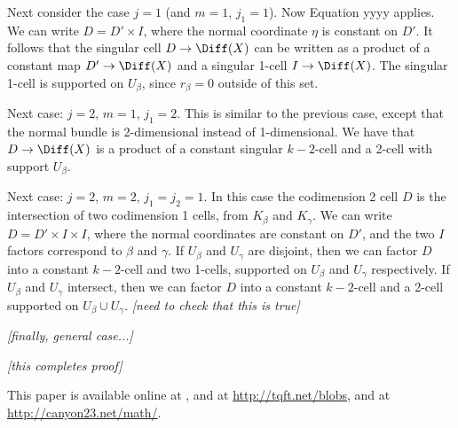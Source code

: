 \documentclass[11pt,leqno]{amsart}
\def\nn#1{{{\it \small [#1]}}}
\begin{document}
Next consider the case $j = 1$ (and $m=1$, $j_1=1$).
Now Equation yyyy applies.
We can write $D = D'\times I$, where the normal coordinate $\eta$ is constant on $D'$.
It follows that the singular cell $D \to \Diff(X)$ can be written as a product
of a constant map $D' \to \Diff(X)$ and a singular 1-cell $I \to \Diff(X)$.
The singular 1-cell is supported on $U_\beta$, since $r_\beta = 0$ outside of this set.

Next case: $j=2$, $m=1$, $j_1 = 2$.
This is similar to the previous case, except that the normal bundle is 2-dimensional instead of
1-dimensional.
We have that $D \to \Diff(X)$ is a product of a constant singular $k{-}2$-cell
and a 2-cell with support $U_\beta$.

Next case: $j=2$, $m=2$, $j_1 = j_2 = 1$.
In this case the codimension 2 cell $D$ is the intersection of two
codimension 1 cells, from $K_\beta$ and $K_\gamma$.
We can write $D = D' \times I \times I$, where the normal coordinates are constant
on $D'$, and the two $I$ factors correspond to $\beta$ and $\gamma$.
If $U_\beta$ and $U_\gamma$ are disjoint, then we can factor $D$ into a constant $k{-}2$-cell and
two 1-cells, supported on $U_\beta$ and $U_\gamma$ respectively.
If $U_\beta$ and $U_\gamma$ intersect, then we can factor $D$ into a constant $k{-}2$-cell and
a 2-cell supported on $U_\beta \cup U_\gamma$.
\nn{need to check that this is true}

\nn{finally, general case...}

\nn{this completes proof}







This paper is available online at , and at
\url{http://tqft.net/blobs},
and at \url{http://canyon23.net/math/}.

\end{document}
